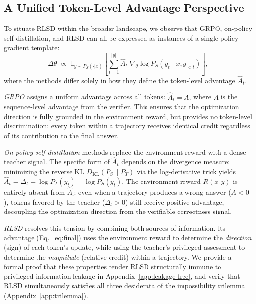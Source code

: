 \documentclass[]{jingdong}
\begin{document}
\subsection{A Unified Token-Level Advantage Perspective}
\label{sec:unified}
 
To situate RLSD within the broader landscape, we observe that GRPO, on-policy self-distillation, and RLSD can all be expressed as instances of a single policy gradient template:
\begin{equation}
    \Delta\theta \;\propto\; \mathbb{E}_{y \sim P_S(\cdot|x)}\!\left[\sum_{t=1}^{|y|} \hat{A}_t \;\nabla_\theta \log P_S(y_t \mid x, y_{<t})\right],
    \label{eq:unified}
\end{equation}
where the methods differ solely in how they define the token-level advantage $\hat{A}_t$. %
 
\textit{GRPO} assigns a uniform advantage across all tokens: $\hat{A}_t = A$, where $A$ is the sequence-level advantage from the verifier. This ensures that the optimization direction is fully grounded in the environment reward, but provides no token-level discrimination: every token within a trajectory receives identical credit regardless of its contribution to the final answer.
 
\textit{On-policy self-distillation} methods replace the environment reward with a dense teacher signal. The specific form of $\hat{A}_t$ depends on the divergence measure: minimizing the reverse KL $D_{\mathrm{KL}}(P_S \| P_T)$ via the log-derivative trick yields $\hat{A}_t = \Delta_t = \log P_T(y_t) - \log P_S(y_t)$.
The environment reward $R(x,y)$ is entirely absent from $\hat{A}_t$: even when a trajectory produces a wrong answer ($A < 0$), tokens favored by the teacher ($\Delta_t > 0$) still receive positive advantage, decoupling the optimization direction from the verifiable correctness signal.
 
\textit{RLSD} resolves this tension by combining both sources of information. Its advantage (Eq.~\ref{eq:final}) uses the environment reward to determine the \textit{direction} (sign) of each token's update, while using the teacher's privileged assessment to determine the \textit{magnitude} (relative credit) within a trajectory. We provide a formal proof that these properties render RLSD structurally immune to privileged information leakage in Appendix~\ref{app:leakage-free}, and verify that RLSD simultaneously satisfies all three desiderata of the impossibility trilemma (Appendix~\ref{app:trilemma}).
 
\end{document}

